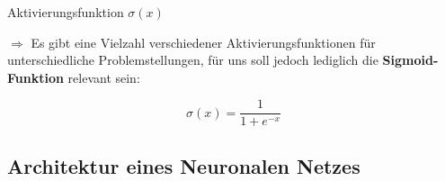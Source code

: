 \begin{frame}{Aktivierungsfunktion \(\sigma(x)\)}
  \begin{minipage}{.45\textwidth}
    \(\Rightarrow\) Es gibt eine Vielzahl verschiedener Aktivierungsfunktionen für unterschiedliche Problemstellungen, für uns soll jedoch lediglich die \textbf{Sigmoid-Funktion} relevant sein:

    \vspace{1cm}

    \[\sigma(x) = \frac{1}{1 + e^{-x}}\]
  \end{minipage}\hfill%
  \begin{minipage}{.5\textwidth}
  \end{minipage}
\end{frame}

\subsection{Architektur eines Neuronalen Netzes}%
\label{sec:nn}

